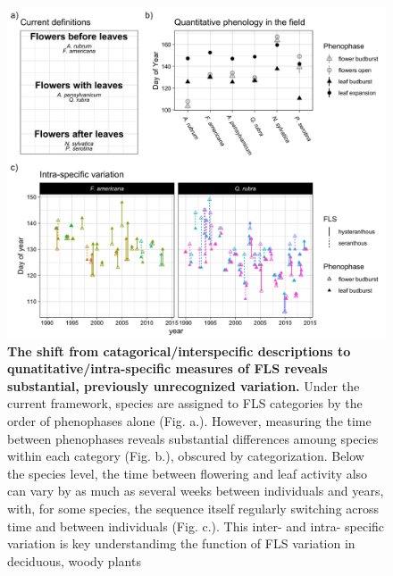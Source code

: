 \documentclass{article}
\begin{document}
 \begin{figure}[h!]
        \centering
          \includegraphics[width=\textwidth]{..//HarvardForest/FLS_viz.jpeg}
          \caption{\textbf{The shift from catagorical/interspecific descriptions to qunatitative/intra-specific measures of FLS reveals substantial, previously unrecognized variation.} Under the current framework, species are assigned to FLS categories by the order of phenophases alone (Fig. a.). However,  measuring the time between phenophases reveals substantial differences amoung species within each category (Fig. b.), obscured by categorization. Below the species level, the time between flowering and leaf activity also can vary by as much as several weeks between individuals and years, with, for some species, the sequence itself regularly switching across time and between individuals (Fig. c.). This inter- and intra- specific variation is key understandimg the function of FLS variation in deciduous, woody plants}
        \label{fig:vizzy}
    \end{figure}
    
\end{document}
